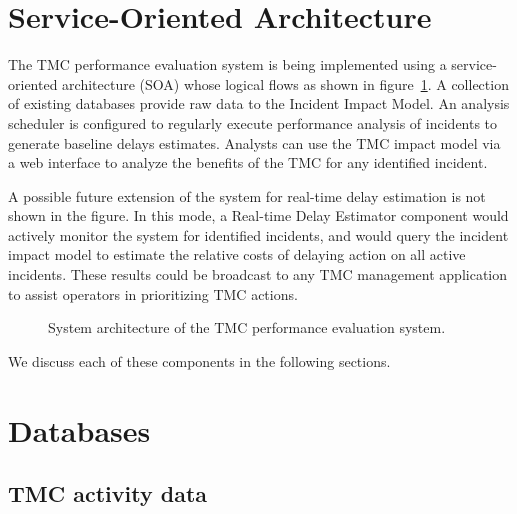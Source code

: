 \documentclass[12pt]{report}
\newcommand{\inputTikZ}[1]{%
    \begin{singlespace}
    \end{singlespace}
  }
\newcommand{\inputTikZ}[1]{%
    \begin{singlespace}
    \beginpgfgraphicnamed{#1-external}%
    \endpgfgraphicnamed%
    \end{singlespace}
  }
\newcounter{time}
\newcounter{space}
\begin{document}
\section{Service-Oriented Architecture}
\label{sec:soa}

The \ac{TMC} performance evaluation system is being implemented using a
service-oriented architecture (SOA) whose logical flows as shown in
figure~\ref{fig:system-arch}. A collection of existing databases
provide raw data to the Incident Impact Model.  An analysis scheduler
is configured to regularly execute performance analysis of incidents
to generate baseline delays estimates.  Analysts can use the \ac{TMC}
impact model via a web interface to analyze the benefits of the \ac{TMC}
for any identified incident.

A possible future extension of the system for real-time delay
estimation is not shown in the figure. In this mode, a Real-time Delay
Estimator component would actively monitor the system for identified
incidents, and would query the incident impact model to estimate the
relative costs of delaying action on all active incidents. These
results could be broadcast to any \ac{TMC} management application to assist
operators in prioritizing \ac{TMC} actions.  

\begin{figure}[t]
  \begin{center}
    \inputTikZ{figs/status}
    \caption{System architecture of the TMC performance evaluation
      system.  }
    \label{fig:system-arch}
  \end{center}
\end{figure}

We discuss each of these components in the following sections.


\section{Databases}
\label{sec:databases}

\subsection{TMC activity data}
\label{sec:activity-data}
\end{document}
